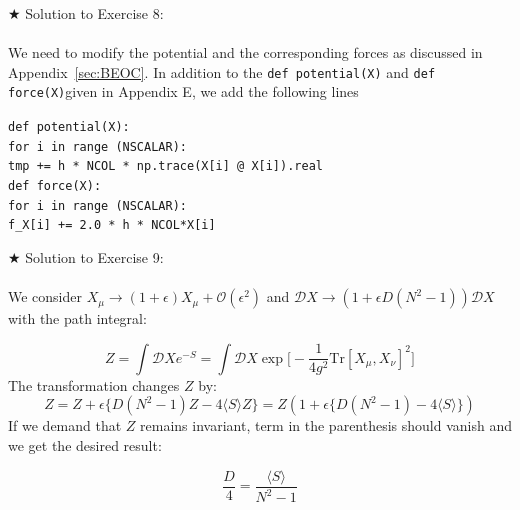 \documentclass[11pt]{article}
\newcommand\tab[1][1cm]{\hspace*{#1}}
\begin{document}
\noindent $\bigstar$ Solution to Exercise 8:
\\  \\ 
We need to modify the potential and the corresponding forces as discussed in Appendix~\ref{sec:BEOC}. In addition to the \verb"def potential(X)" 
and \verb"def force(X)"given in Appendix E, we add the following lines 

\begin{footnotesize} 

\begin{mdframed}[backgroundcolor=blue!3] 
 \verb"def potential(X):" \\
 \tab	\verb"for i in range (NSCALAR):" \\ 
    \tab     \tab	\verb"tmp += h * NCOL * np.trace(X[i] @ X[i]).real" \\
    
\vspace{5mm} 
\noindent
\verb"def force(X):" \\ 
\tab	\verb"for i in range (NSCALAR):"  \\ 
       \tab  \tab 	\verb"f_X[i] += 2.0 * h * NCOL*X[i] " 
\end{mdframed}
\end{footnotesize} 

\noindent $\bigstar$ Solution to Exercise 9: 
\\ \\ 
We consider $ X_{\mu} \to (1 + \epsilon) X_{\mu} + \mathcal{O}(\epsilon^2)$
and $\mathcal{D}X \to (1 + \epsilon D (N^2-1))\mathcal{D}X$ with the path integral:

\begin{equation}
	Z = \int \mathcal{D}X e^{-S} = \int \mathcal{D}X \exp\Big[-\frac{1}{4g^2} \mbox{Tr} [X_\mu,X_\nu]^2\Big]
\end{equation}
The transformation changes $Z$ by:
\begin{equation}
	Z = Z + \epsilon \Big\{ D(N^2 -1)Z - 4\langle S \rangle Z  \Big\} = Z ( 1 + \epsilon \Big\{ D(N^2 -1) - 4\langle S \rangle   \Big\})
\end{equation}
If we demand that $Z$ remains invariant, term in the parenthesis should vanish and we get the desired result:

\begin{equation}
	\frac{D}{4} = \frac{\langle S \rangle}{N^2 - 1 }
\end{equation}  
           
\end{document}
